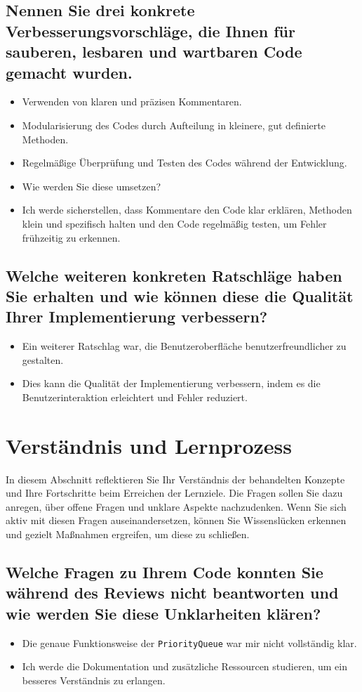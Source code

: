 \documentclass[a4paper,11pt]{article}
\begin{document}
\subsection*{Nennen Sie drei konkrete Verbesserungsvorschläge, die Ihnen für sauberen, lesbaren und wartbaren Code gemacht wurden.}
\begin{itemize}
    \item Verwenden von klaren und präzisen Kommentaren.
    \item Modularisierung des Codes durch Aufteilung in kleinere, gut definierte Methoden.
    \item Regelmäßige Überprüfung und Testen des Codes während der Entwicklung.
    \item Wie werden Sie diese umsetzen?
    \item Ich werde sicherstellen, dass Kommentare den Code klar erklären, Methoden klein und spezifisch halten und den Code regelmäßig testen, um Fehler frühzeitig zu erkennen.
\end{itemize}

\subsection*{Welche weiteren konkreten Ratschläge haben Sie erhalten und wie können diese die Qualität Ihrer Implementierung verbessern?}
\begin{itemize}
    \item Ein weiterer Ratschlag war, die Benutzeroberfläche benutzerfreundlicher zu gestalten.
    \item Dies kann die Qualität der Implementierung verbessern, indem es die Benutzerinteraktion erleichtert und Fehler reduziert.
\end{itemize}

\section*{Verständnis und Lernprozess}

In diesem Abschnitt reflektieren Sie Ihr Verständnis der behandelten Konzepte und Ihre Fortschritte beim Erreichen der Lernziele. Die Fragen sollen Sie dazu anregen, über offene Fragen und unklare Aspekte nachzudenken. Wenn Sie sich aktiv mit diesen Fragen auseinandersetzen, können Sie Wissenslücken erkennen und gezielt Maßnahmen ergreifen, um diese zu schließen.

\subsection*{Welche Fragen zu Ihrem Code konnten Sie während des Reviews nicht beantworten und wie werden Sie diese Unklarheiten klären?}
\begin{itemize}
    \item Die genaue Funktionsweise der \texttt{PriorityQueue} war mir nicht vollständig klar.
    \item Ich werde die Dokumentation und zusätzliche Ressourcen studieren, um ein besseres Verständnis zu erlangen.
\end{itemize}
\end{document}
